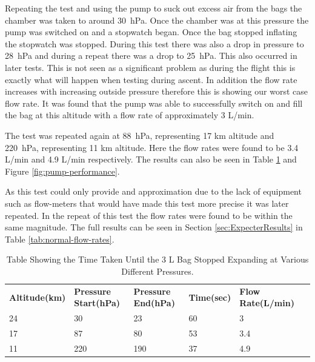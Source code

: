\documentclass[a4paper,12pt,oneside]{article}
\begin{document}
\begin{appendices}
Repeating the test and using the pump to suck out excess air from the bags the chamber was taken to around \SI{30}{\hecto\pascal}. Once the chamber was at this pressure the pump was switched on and a stopwatch began. Once the bag stopped inflating the stopwatch was stopped. During this test there was also a drop in pressure to \SI{28}{\hecto\pascal} and during a repeat there was a drop to \SI{25}{\hecto\pascal}. This also occurred in later tests. This is not seen as a significant problem as during the flight this is exactly what will happen when testing during ascent. In addition the flow rate increases with increasing outside pressure therefore this is showing our worst case flow rate. It was found that the pump was able to successfully switch on and fill the bag at this altitude with a flow rate of approximately 3 L/min. 

The test was repeated again at \SI{88}{\hecto\pascal}, representing 17 km altitude and \SI{220}{\hecto\pascal}, representing 11 km altitude. Here the flow rates were found to be 3.4 L/min and 4.9 L/min respectively. The results can also be seen in Table \ref{tab:pump-low-pressure-result} and Figure \ref{fig:pump-performance}.

As this test could only provide and approximation due to the lack of equipment such as flow-meters that would have made this test more precise it was later repeated. In the repeat of this test the flow rates were found to be within the same magnitude. The full results can be seen in Section \ref{sec:ExpecterResults} in Table \ref{tab:normal-flow-rates}. 

\begin{table}[H]
\centering

\begin{tabular}{|l|l|l|l|l|l}
\cline{1-5}
\textbf{{\small Altitude(km)}}\par & \textbf{{\small Pressure Start(hPa)}}\par & \textbf{{\small Pressure End(hPa)}}\par & \textbf{{\small Time(sec)}}\par & \textbf{{\small Flow Rate(L/min)}}\par &  \\ \cline{1-5}
24 & 30 & 23 & 60 & 3 &  \\ \cline{1-5}
17 & 87 & 80 & 53 & 3.4 &  \\ \cline{1-5}
11 & 220 & 190 & 37 & 4.9 &  \\ \cline{1-5}
\end{tabular}
\caption{Table Showing the Time Taken Until the 3 L Bag Stopped Expanding at Various Different Pressures.}
\label{tab:pump-low-pressure-result}
\end{table}


\end{appendices}
\end{document}
